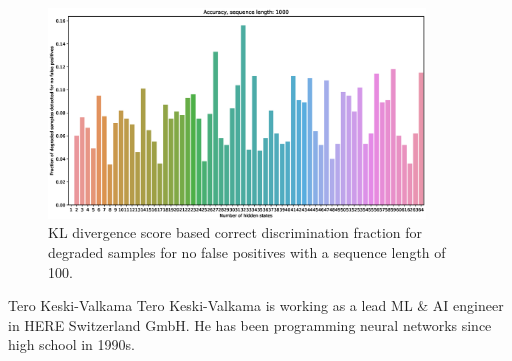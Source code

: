 \documentclass[journal]{IEEEtran}
\begin{document}
\begin{figure}[tb]
 \centering
 \includegraphics[width=10cm,keepaspectratio=true]{./accuracy_1000.eps}
 \caption{KL divergence score based correct discrimination fraction for degraded samples for no false positives with a sequence length of 100.}
 \label{figure:discrimination_rate_1000}
\end{figure}

\appendices




\begin{IEEEbiography}{Tero Keski-Valkama}
Tero Keski-Valkama is working as a lead ML \& AI engineer in HERE Switzerland GmbH. He has been programming neural networks since high school in 1990s.
\end{IEEEbiography}
\end{document}

